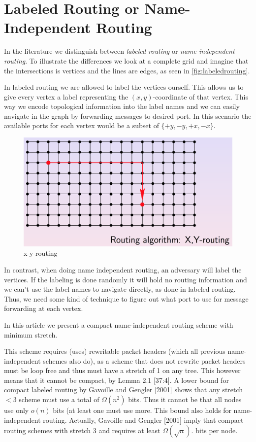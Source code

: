 \section{Labeled Routing or Name-Independent Routing}
In the literature we distinguish between \emph{labeled routing} or
\emph{name-independent routing}. To illustrate the differences we look at a complete
grid and imagine that the intersections is vertices and the lines are edges, as seen in \autoref{fig:labeledrouting}.

In labeled routing we are allowed to label the vertices ourself. This allows
us to give every vertex a label representing the $(x,y)$-coordinate of that
vertex. This way we encode topological information into the label names and we
can easily navigate in the graph by forwarding messages to desired port. In
this scenario the available ports for each vertex would be a subset of $\{+y,
-y, +x, -x\}$.
\begin{figure}[htbp]
    \centering
    \includegraphics[scale=0.3]{images/xyrouting.png}
    \caption{x-y-routing}
    \label{fig:labeledrouting}
\end{figure}

In contrast, when doing name independent routing, an adversary will label the
vertices. If the labeling is done randomly it will hold no routing information
and we can't use the label names to navigate directly, as done in labeled routing. Thus, we need some kind of
technique to figure out what port to use for message forwarding at each vertex.

In this article we present a compact name-independent routing scheme with minimum stretch.

This scheme requires (uses) rewritable packet headers (which all previous name-independent schemes also do), as a scheme that does not rewrite packet headers must be loop free and thus must have a stretch of 1 on any tree. This however means that it cannot be compact, by Lemma 2.1 \cite{compactNameIndepRouting}[37:4]. A lower bound for compact labeled routing by Gavoille and Gengler [2001] \cite{gavoilleAndGengler2001} shows that any stretch $< 3$ scheme must use a total of $\Omega(n^2)$ bits. Thus it cannot be that all nodes use only $o(n)$ bits (at least one must use more. This bound also holds for name-independent routing. Actually, Gavoille and Gengler [2001] \cite{gavoilleAndGengler2001} imply that compact routing schemes with stretch 3 and requires at least $\Omega(\sqrt{n})$. bits per node.

